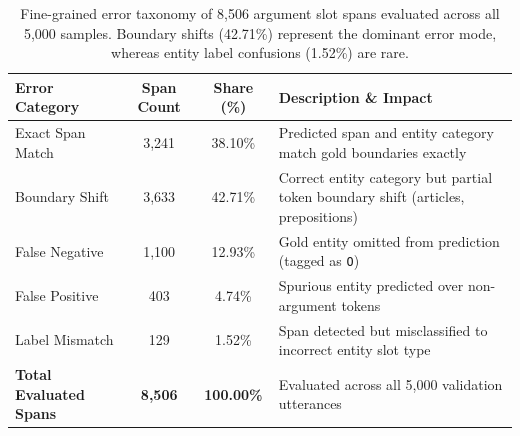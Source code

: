 \begin{table}[t]
\centering
\small
\caption{Fine-grained error taxonomy of 8,506 argument slot spans evaluated across all 5,000 samples. Boundary shifts (42.71\%) represent the dominant error mode, whereas entity label confusions (1.52\%) are rare.}
\label{tab:error_taxonomy}
\begin{tabular}{lccl}
\toprule
\textbf{Error Category} & \textbf{Span Count} & \textbf{Share (\%)} & \textbf{Description \& Impact} \\
\midrule
Exact Span Match & 3,241 & 38.10\% & Predicted span and entity category match gold boundaries exactly \\
Boundary Shift & 3,633 & 42.71\% & Correct entity category but partial token boundary shift (articles, prepositions) \\
False Negative & 1,100 & 12.93\% & Gold entity omitted from prediction (tagged as \texttt{O}) \\
False Positive & 403 & 4.74\% & Spurious entity predicted over non-argument tokens \\
Label Mismatch & 129 & 1.52\% & Span detected but misclassified to incorrect entity slot type \\
\midrule
\textbf{Total Evaluated Spans} & \textbf{8,506} & \textbf{100.00\%} & Evaluated across all 5,000 validation utterances \\
\bottomrule
\end{tabular}
\end{table}
